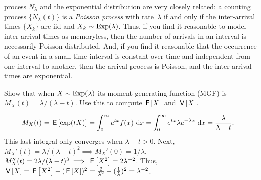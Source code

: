 \documentclass[queueing-book.tex]{subfiles}
\begin{document}
 process $N_{\lambda}$ and the exponential distribution are very closely related: a counting process $\{N_{\lambda}(t)\}$ is a \emph{Poisson process} with rate~$\lambda$ if and only if the inter-arrival times $\{X_k\}$ are iid and $X_{k} \sim \mathrm{Exp}(\lambda)$.
Thus, if you find it reasonable to model inter-arrival times as memoryless, then the number of arrivals in an interval is necessarily Poisson distributed.
And, if you find it reasonable that the occurrence of an event in a small time interval is constant over time and independent from one interval to another, then the arrival process is Poisson, and the inter-arrival times are exponential.







\begin{exercise}\label{ex:11}
Show that when $X\sim \mathrm{Exp}(\lambda)$ its moment-generating function (MGF)
is $ M_X(t) = \lambda/(\lambda -t)$.
Use this to compute $\,\mathsf{E}\left[X\right]$ and $\,\mathsf{V}\left[X\right]$.
\begin{solution}
 \begin{align*}
 M_X(t) &= \,\mathsf{E}\left[\exp(t X)\right]
=\int_0^\infty e^{tx} f(x) \,\,\textrm{d}x
=\int_0^\infty e^{tx} \lambda e^{-\lambda x} \,\,\textrm{d}x =\frac{\lambda}{\lambda -t}.
 \end{align*}
This last integral only converges when $\lambda -t > 0$. Next, $M_X'(t)=\lambda/(\lambda-t)^2 \implies M_X'(0)=1/\lambda$, $M_X''(t)=2\lambda/(\lambda-t)^3 \implies \,\mathsf{E}\left[X^2\right]=2\lambda^{-2}$.
Thus, $\,\mathsf{V}\left[X\right] = \,\mathsf{E}\left[X^2\right] - (\,\mathsf{E}\left[X\right])^2 = \frac{2}{\lambda^2} - (\frac{1}{\lambda})^2 = \lambda^{-2}$.
\end{solution}
\end{exercise}
\end{document}

